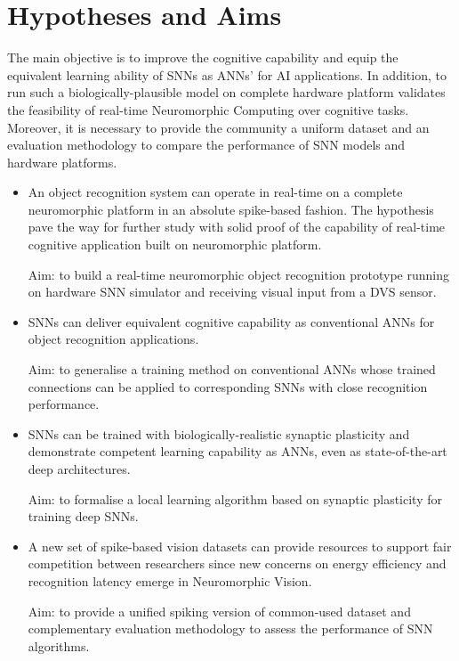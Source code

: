\section{Hypotheses and Aims}
\label{sec:aim}
The main objective is to improve the cognitive capability and equip the equivalent learning ability of SNNs as ANNs' for AI applications.
In addition, to run such a biologically-plausible model on complete hardware platform validates the feasibility of real-time Neuromorphic Computing over cognitive tasks.
Moreover, it is necessary to provide the community a uniform dataset and an evaluation methodology to compare the performance of SNN models and hardware platforms.

\begin{itemize}
	\item 
	An object recognition system can operate in real-time on a complete neuromorphic platform in an absolute spike-based fashion.
	The hypothesis pave the way for further study with solid proof of the capability of real-time cognitive application built on neuromorphic platform.

	Aim: to build a real-time neuromorphic object recognition prototype running on hardware SNN simulator and receiving visual input from a DVS sensor.

	\item 
	SNNs can deliver equivalent cognitive capability as conventional ANNs for object recognition applications.

	Aim: to generalise a training method on conventional ANNs whose trained connections can be applied to corresponding SNNs with close recognition performance.

	\item 
	SNNs can be trained with biologically-realistic synaptic plasticity and demonstrate competent learning capability as ANNs, even as state-of-the-art deep architectures.

	Aim: to formalise a local learning algorithm based on synaptic plasticity for training deep SNNs.

	\item 
	A new set of spike-based vision datasets can provide resources to support fair competition between researchers since new concerns on energy efficiency and recognition latency emerge in Neuromorphic Vision.

	Aim: to provide a unified spiking version of common-used dataset and complementary evaluation methodology to assess the performance of SNN algorithms.
\end{itemize}


